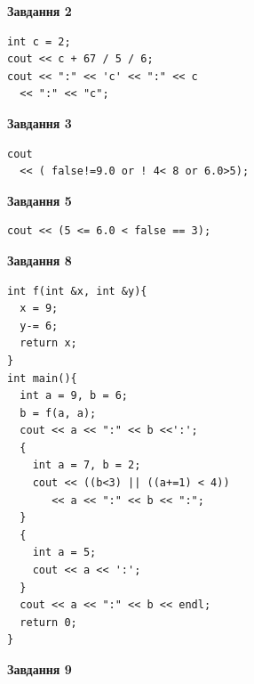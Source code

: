 \documentclass[12pt, ukrainian]{article}
\begin{document}
{\begin {large}
\begin{minipage}[t]{7.0cm}
\end{minipage}
\vline \hspace{1mm}
\begin{minipage}[t]{11.0cm}

\begin{center}
\textbf{Завдання 2}
\end{center}
\vspace{-8mm}

\begin{verbatim}
int c = 2;
cout << c + 67 / 5 / 6;
cout << ":" << 'c' << ":" << c 
  << ":" << "c";
\end{verbatim}



\begin{center}
\textbf{Завдання 3}
\end{center}
\vspace{-8mm}

\begin{verbatim}
cout 
  << ( false!=9.0 or ! 4< 8 or 6.0>5);
\end{verbatim}



\begin{center}
\textbf{Завдання 5}
\end{center}
\vspace{-8mm}

\begin{verbatim}
cout << (5 <= 6.0 < false == 3);
\end{verbatim}



\begin{center}
\textbf{Завдання 8}
\end{center}
\vspace{-8mm}

\begin{verbatim}
int f(int &x, int &y){
  x = 9;
  y-= 6;
  return x;
}
int main(){
  int a = 9, b = 6;
  b = f(a, a);
  cout << a << ":" << b <<':';
  {
    int a = 7, b = 2;
    cout << ((b<3) || ((a+=1) < 4))
       << a << ":" << b << ":";
  }
  {
    int a = 5;
    cout << a << ':';
  }
  cout << a << ":" << b << endl;
  return 0;
}
\end{verbatim}

\end{minipage}


\begin{minipage}[t]{7.0cm}

\begin{center}
\textbf{Завдання 9}
\end{center}
\vspace{-8mm}


\end{minipage}
\end{large}}
\end{document}
